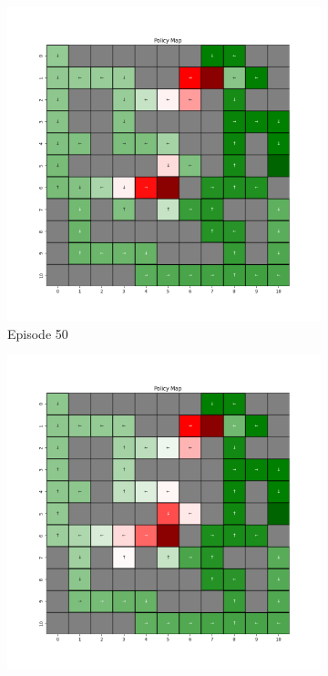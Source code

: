 \documentclass{assignment}
\begin{document}
\begin{figure}[H]
\begin{subfigure}{0.3\textwidth}
        \includegraphics[width=\textwidth]{figures/policy_td/epsilon_sweep/policy_alpha_0.1_gamma_0.95_epsilon_1.0_iteration_50.png}
    \caption{Episode 50}
    \end{subfigure}\hfill
    \begin{subfigure}{0.3\textwidth}
        \includegraphics[width=\textwidth]{figures/policy_td/epsilon_sweep/policy_alpha_0.1_gamma_0.95_epsilon_1.0_iteration_100.png}

\end{subfigure}
\end{figure}
\end{document}
